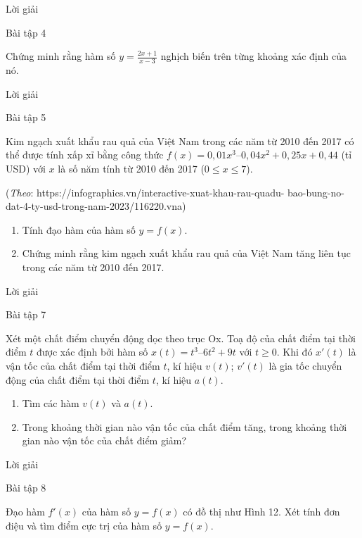 \documentclass[
]{article}
\providecommand{\tightlist}{%
  \setlength{\itemsep}{0pt}\setlength{\parskip}{0pt}}\usepackage{longtable,booktabs,array}
\begin{document}
\begin{tcolorbox}
\begin{figure}
\begin{minipage}{0.33\linewidth}
\end{minipage}%

\end{figure}%

Lời giải

Bài tập 4

Chứng minh rằng hàm số \(y=\frac{2x+1}{x-3}\) nghịch biến trên từng
khoảng xác định của nó.

Lời giải

Bài tập 5

Kim ngạch xuất khẩu rau quả của Việt Nam trong các năm từ 2010 đến 2017
có thể được tính xấp xỉ bằng công thức
\(f(x)=0,01x^3–0,04x^2+0,25x + 0,44\) (tỉ USD) với \(x\) là số năm tính
từ 2010 đến 2017 (\(0 \leq x \leq 7\)).

(\emph{Theo}: https://infographics.vn/interactive-xuat-khau-rau-quadu-
bao-bung-no-dat-4-ty-usd-trong-nam-2023/116220.vna)

\begin{enumerate}
\def\labelenumi{\alph{enumi}.}
\tightlist
\item
  Tính đạo hàm của hàm số \(y=f(x)\).
\item
  Chứng minh rằng kim ngạch xuất khẩu rau quả của Việt Nam tăng liên tục
  trong các năm từ 2010 đến 2017.
\end{enumerate}

Lời giải

Bài tập 7

Xét một chất điểm chuyển động dọc theo trục Ox. Toạ độ của chất điểm tại
thời điểm \(t\) được xác định bởi hàm số \(x(t) = t^3 – 6t^2 + 9t\) với
\(t \geq 0\). Khi đó \(x'(t)\) là vận tốc của chất điểm tại thời điểm
\(t\), kí hiệu \(v(t)\); \(v'(t)\) là gia tốc chuyển động của chất điểm
tại thời điểm \(t\), kí hiệu \(a(t)\).

\begin{enumerate}
\def\labelenumi{\alph{enumi}.}
\tightlist
\item
  Tìm các hàm \(v(t)\) và \(a(t)\).
\item
  Trong khoảng thời gian nào vận tốc của chất điểm tăng, trong khoảng
  thời gian nào vận tốc của chất điểm giảm?
\end{enumerate}

Lời giải

Bài tập 8

Đạo hàm \(f'(x)\) của hàm số \(y=f(x)\) có đồ thị như Hình 12. Xét tính
đơn điệu và tìm điểm cực trị của hàm số \(y=f(x)\).

\begin{figure}[H]


\end{figure}
\end{tcolorbox}
\end{document}

